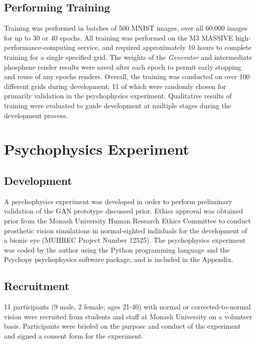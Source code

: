 \documentclass[a4paper,11pt,openany]{book}
\begin{document}
\section*{Performing Training}
\label{sec:orgbe6c42e}

Training was performed in batches of 500 MNIST images, over all 60,000 images for up to 30 or 40 epochs.
All training was performed on the M3 MASSIVE high-performance-computing service, and required approximately 10 hours to complete training for a single specified grid.
The weights of the \emph{Generator} and intermediate phosphene render results were saved after each epoch to permit early stopping and reuse of any epochs renders.
Overall, the training was conducted on over 100 different grids during development; 11 of which were randomly chosen for primarily validation in the psychophysics experiment.
Qualitative results of training were evaluated to guide development at multiple stages during the development process.

\chapter{Psychophysics Experiment}
\label{sec:org2be8d7c}
\section*{Development}
\label{sec:org7698bc0}

A psychophysics experiment was developed in order to perform preliminary validation of the GAN prototype discussed prior.
Ethics approval was obtained prior from the Monash University Human Research Ethics Committee to conduct prosthetic vision simulations in normal-sighted indiiduals for the development of a bionic eye (MUHREC Project Number 12525).
The psychophysics experiment was coded by the author using the Python programming language and the Psychopy psychophysics software package, and is included in the Appendix.

\section*{Recruitment}
\label{sec:org531adf6}

11 participants (9 male, 2 female; ages 21-40) with normal or corrected-to-normal vision were recruited from students and staff at Monash University on a volunteer basis.
Participants were briefed on the purpose and conduct of the experiment and signed a consent form for the experiment.
\end{document}
